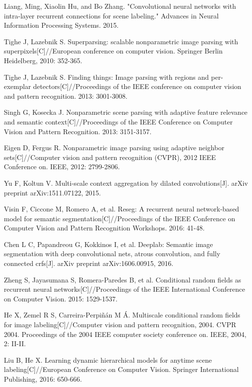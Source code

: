 \documentclass[10.5pt,compsoc]{TsT}
\theoremstyle{mystyle}
\begin{document}
\begin{thebibliography}{99}
Liang, Ming, Xiaolin Hu, and Bo Zhang. "Convolutional neural networks with intra-layer recurrent connections for scene labeling." Advances in Neural Information Processing Systems. 2015.

Tighe J, Lazebnik S. Superparsing: scalable nonparametric image parsing with superpixels[C]//European conference on computer vision. Springer Berlin Heidelberg, 2010: 352-365.

Tighe J, Lazebnik S. Finding things: Image parsing with regions and per-exemplar detectors[C]//Proceedings of the IEEE conference on computer vision and pattern recognition. 2013: 3001-3008.

Singh G, Kosecka J. Nonparametric scene parsing with adaptive feature relevance and semantic context[C]//Proceedings of the IEEE Conference on Computer Vision and Pattern Recognition. 2013: 3151-3157.

Eigen D, Fergus R. Nonparametric image parsing using adaptive neighbor sets[C]//Computer vision and pattern recognition (CVPR), 2012 IEEE Conference on. IEEE, 2012: 2799-2806.

Yu F, Koltun V. Multi-scale context aggregation by dilated convolutions[J]. arXiv preprint arXiv:1511.07122, 2015.

Visin F, Ciccone M, Romero A, et al. Reseg: A recurrent neural network-based model for semantic segmentation[C]//Proceedings of the IEEE Conference on Computer Vision and Pattern Recognition Workshops. 2016: 41-48.

Chen L C, Papandreou G, Kokkinos I, et al. Deeplab: Semantic image segmentation with deep convolutional nets, atrous convolution, and fully connected crfs[J]. arXiv preprint arXiv:1606.00915, 2016.

Zheng S, Jayasumana S, Romera-Paredes B, et al. Conditional random fields as recurrent neural networks[C]//Proceedings of the IEEE International Conference on Computer Vision. 2015: 1529-1537.

He X, Zemel R S, Carreira-Perpiñán M Á. Multiscale conditional random fields for image labeling[C]//Computer vision and pattern recognition, 2004. CVPR 2004. Proceedings of the 2004 IEEE computer society conference on. IEEE, 2004, 2: II-II.

Liu B, He X. Learning dynamic hierarchical models for anytime scene labeling[C]//European Conference on Computer Vision. Springer International Publishing, 2016: 650-666.


\end{thebibliography}
\end{document}
